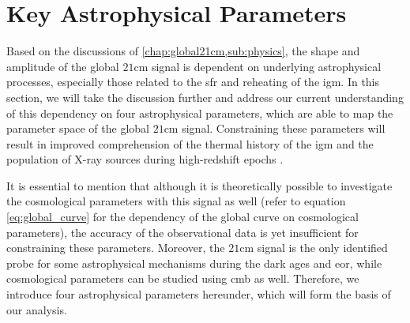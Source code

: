 \documentclass[12pt, TexShade, letterpaper]{report}
\begin{document}
\section{Key Astrophysical Parameters}
\label{chap:results,sub:parameters}
Based on the discussions of \ref{chap:global21cm,sub:physics}, the shape and amplitude of the global $\mathrm{21cm}$ signal is dependent on underlying astrophysical processes, especially those related to the \gls{sfr} and reheating of the \gls{igm}. In this section, we will take the discussion further and address our current understanding of this dependency on four astrophysical parameters, which are able to map the parameter space of the global $\mathrm{21cm}$ signal. Constraining these parameters will result in improved comprehension of the thermal history of the \gls{igm} and the population of X-ray sources during high-redshift epochs \cite{21century}.\par
It is essential to mention that although it is theoretically possible to investigate the cosmological parameters with this signal as well (refer to equation \ref{eq:global_curve} for the dependency of the global curve on cosmological parameters), the accuracy of the observational data is yet insufficient for constraining these parameters. Moreover, the $\mathrm{21cm}$ signal is the only identified probe for some astrophysical mechanisms during the dark ages and \gls{eor}, while cosmological parameters can be studied using \gls{cmb} as well. Therefore, we introduce four astrophysical parameters hereunder, which will form the basis of our analysis. \par
\end{document}
